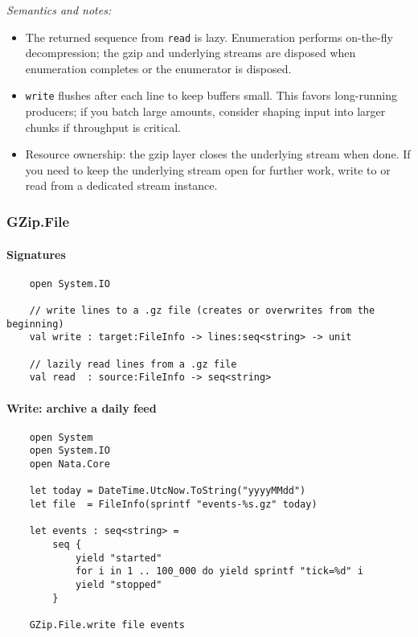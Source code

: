 \documentclass{article}
\begin{document}
\emph{Semantics and notes:}
\begin{itemize}
  \item The returned sequence from \texttt{read} is lazy. Enumeration performs on-the-fly decompression; the gzip and underlying streams are disposed when enumeration completes or the enumerator is disposed.
  \item \texttt{write} flushes after each line to keep buffers small. This favors long-running producers; if you batch large amounts, consider shaping input into larger chunks if throughput is critical.
  \item Resource ownership: the gzip layer closes the underlying stream when done. If you need to keep the underlying stream open for further work, write to or read from a dedicated stream instance.
\end{itemize}

\subsubsection{GZip.File}

\paragraph{Signatures}
\begin{verbatim}
    open System.IO

    // write lines to a .gz file (creates or overwrites from the beginning)
    val write : target:FileInfo -> lines:seq<string> -> unit

    // lazily read lines from a .gz file
    val read  : source:FileInfo -> seq<string>
\end{verbatim}

\paragraph{Write: archive a daily feed}
\begin{verbatim}
    open System
    open System.IO
    open Nata.Core

    let today = DateTime.UtcNow.ToString("yyyyMMdd")
    let file  = FileInfo(sprintf "events-%s.gz" today)

    let events : seq<string> =
        seq {
            yield "started"
            for i in 1 .. 100_000 do yield sprintf "tick=%d" i
            yield "stopped"
        }

    GZip.File.write file events
\end{verbatim}
\end{document}
